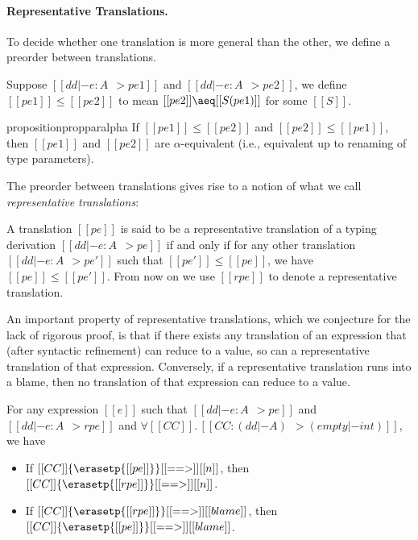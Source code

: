 \paragraph{Representative Translations.}
To decide whether one translation is more general than the other, we define a preorder
between translations.

\begin{definition}
  Suppose $[[dd |- e : A ~~> pe1]]$ and $[[dd |- e : A ~~> pe2]]$,
  we define $[[pe1]] \leq [[pe2]]$ to mean $[[pe2]] \aeq [[S(pe1)]]$ for
  some $[[S]]$.
\end{definition}

\begin{restatable}[]{proposition}{propparalpha}
  \label{prop:parameter:alpha}
  If $[[ pe1 ]] \leq [[pe2]]$ and $[[ pe2 ]] \leq [[pe1]]$, then $[[pe1]]$ and
  $[[pe2]]$ are $\alpha$-equivalent (i.e., equivalent up to renaming of type parameters).
\end{restatable}

The preorder between translations gives rise to a notion of
what we call \textit{representative translations}:

\begin{definition}
  A translation $[[pe]]$ is said to be a representative translation of a typing
  derivation $[[dd |- e : A ~~> pe]]$ if and only if for any other translation
  $[[dd |- e : A ~~> pe']]$ such that $[[pe']] \leq [[pe]]$, we have $[[pe]]
  \leq [[pe']]$. From now on we use $[[rpe]]$ to denote a representative
  translation.
\end{definition}

An important property of representative translations, which we conjecture for
the lack of rigorous proof, is that if there exists any translation of an
expression that (after syntactic refinement) can reduce to a value, so can a
representative translation of that expression. Conversely, if a
representative translation runs into a blame, then no translation of that
expression can reduce to a value.

\begin{conjecture}\label{lemma:repr}
  For any expression $[[e]]$ such that $[[ dd |- e : A ~~> pe ]]$ and $[[ dd |- e : A ~~> rpe ]]$ and
  $\forall [[CC]].\, [[CC : (dd |- A) ~~> (empty |- int) ]]   $, we have
  \begin{itemize}
  \item If $  [[CC]] \{  \erasetp{[[pe]]} \}  [[==>]] [[n]]$, then $ [[CC]] \{   \erasetp{[[rpe]]}   \} [[==>]] [[n]]$.
  \item If $[[CC]] \{ \erasetp {[[rpe]]}   \} [[==>]] [[blame]]$, then $ [[CC]] \{ \erasetp {[[pe]]} \}  [[==>]] [[blame]]$.
  \end{itemize}
\end{conjecture}

